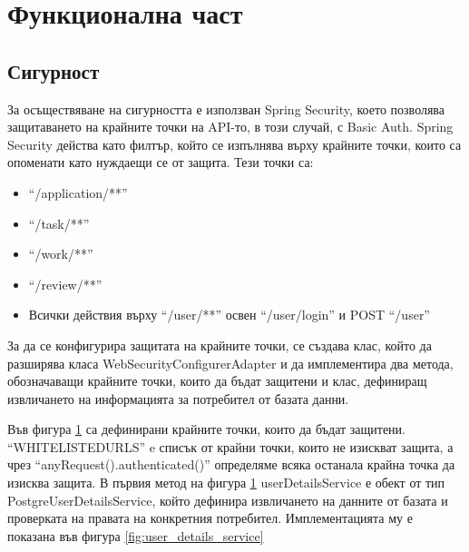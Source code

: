\section{Функционална част}
    \subsection{Сигурност}
    За осъществяване на сигурността е използван Spring Security, което позволява защитаването на крайните точки на API-то, в този случай, с Basic Auth. Spring Security действа като филтър, който се изпълнява върху крайните точки, които са опоменати като нуждаещи се от защита. Тези точки са:
    \begin{itemize}
        \item ``/application/**''
        \item ``/task/**''
        \item ``/work/**''
        \item ``/review/**''
        \item Всички действия върху ``/user/**'' освен ``/user/login'' и POST ``/user''
    \end{itemize}
    
    За да се конфигурира защитата на крайните точки, се създава клас, който да разширява класа WebSecurityConfigurerAdapter и да имплементира два метода, обозначаващи крайните точки, които да бъдат защитени и клас, дефиниращ извличането на информацията за потребител от базата данни.
 
    \begin{figure}[h]
        \centering
        \caption{}
        \label{fig:security_methods}
    \end{figure}

    Във фигура \ref{fig:security_methods} са дефинирани крайните точки, които да бъдат защитени. ``WHITELISTED\textunderscore URLS'' e списък от крайни точки, които не изискват защита, а чрез ``anyRequest().authenticated()'' определяме всяка останала крайна точка да изисква защита. 
    В първия метод на фигура \ref{fig:security_methods} userDetailsService е обект от тип PostgreUserDetailsService, който дефинира извличането на данните от базата и проверката на правата на конкретния потребител. Имплементацията му е показана във фигура \ref{fig:user_details_service}
    
